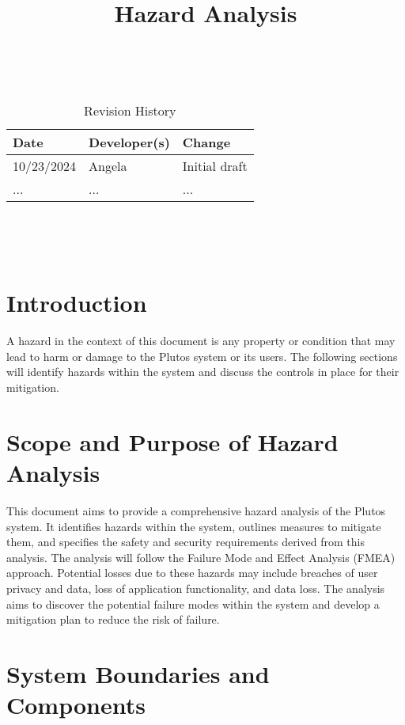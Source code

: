 \documentclass{article}
\title{Hazard Analysis\\\progname}
\author{\authname}
\date{}
\begin{document}
\maketitle
\thispagestyle{empty}

~\newpage


\begin{table}[hp]
\caption{Revision History} \label{TblRevisionHistory}
\begin{tabularx}{\textwidth}{llX}
\toprule
\textbf{Date} & \textbf{Developer(s)} & \textbf{Change}\\
\midrule
10/23/2024 & Angela & Initial draft\\
... & ... & ...\\
\bottomrule
\end{tabularx}
\end{table}

~\newpage

\tableofcontents

~\newpage


\section{Introduction}

A hazard in the context of this document is any property or condition that may
lead to harm or damage to the Plutos system or its users. The following sections
will identify hazards within the system and discuss the controls in place for
their mitigation.


\section{Scope and Purpose of Hazard Analysis}

This document aims to provide a comprehensive hazard analysis of the Plutos
system. It identifies hazards within the system, outlines measures to mitigate
them, and specifies the safety and security requirements derived from this
analysis. The analysis will follow the Failure Mode and Effect Analysis (FMEA)
approach. Potential losses due to these hazards may include breaches of user
privacy and data, loss of application functionality, and data loss. The analysis
aims to discover the potential failure modes within the system and develop a
mitigation plan to reduce the risk of failure. 


\section{System Boundaries and Components}
\end{document}
